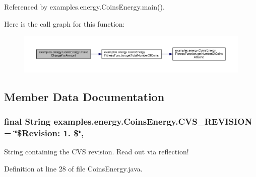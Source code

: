 Referenced by examples.\-energy.\-Coins\-Energy.\-main().



Here is the call graph for this function\-:
\nopagebreak
\begin{figure}[H]
\begin{center}
\leavevmode
\includegraphics[width=350pt]{classexamples_1_1energy_1_1_coins_energy_ab95e158e011d37a7e988c30ad377fdb9_cgraph}
\end{center}
\end{figure}




\subsection{Member Data Documentation}
\hypertarget{classexamples_1_1energy_1_1_coins_energy_ad964325397305c7bd3de4f0b6cba279c}{
\subsubsection[{C\-V\-S\-\_\-\-R\-E\-V\-I\-S\-I\-O\-N}]{\setlength{\rightskip}{0pt plus 5cm}final String examples.\-energy.\-Coins\-Energy.\-C\-V\-S\-\_\-\-R\-E\-V\-I\-S\-I\-O\-N = \char`\"{}\$Revision\-: 1. \$\char`\"{}\hspace{0.3cm}{\ttfamily [static]}, {\ttfamily [private]}}}\label{classexamples_1_1energy_1_1_coins_energy_ad964325397305c7bd3de4f0b6cba279c}
String containing the C\-V\-S revision. Read out via reflection! 

Definition at line 28 of file Coins\-Energy.\-java.

